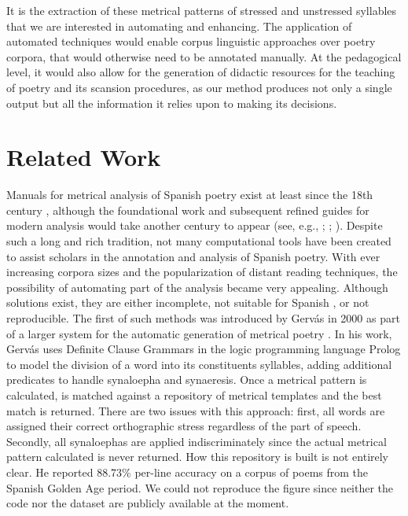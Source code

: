 \documentclass[a4paper,11pt,twocolumn,twoside]{article}
\begin{document}
It is the extraction of these metrical patterns of stressed and unstressed syllables that we are interested in automating and enhancing. The application of automated techniques would enable corpus linguistic approaches over poetry corpora, that would otherwise need to be annotated manually. At the pedagogical level, it would also allow for the generation of didactic resources for the teaching of poetry and its scansion procedures, as our method produces not only a single output but all the information it relies upon to making its decisions.

\section{Related Work}
Manuals for metrical analysis of Spanish poetry exist at least since the 18th century \cite{caparros1975contribucion}, although the foundational work and subsequent refined guides for modern analysis would take another century to appear (see, e.g., \cite{bello1859principios}; \cite{navarro1991metrica}; \cite{caparros1993metrica}). Despite such a long and rich tradition, not many computational tools have been created to assist scholars in the annotation and analysis of Spanish poetry. With ever increasing corpora sizes and the popularization of distant reading techniques, the possibility of automating part of the analysis became very appealing. Although solutions exist, they are either incomplete, not suitable for Spanish \cite{hartman2005scandroid,agirrezabal2016zeuscansion}, or not reproducible. The first of such methods was introduced by Gervás in 2000 as part of a larger system for the automatic generation of metrical poetry \cite{gervas2000logic}. In his work, Gervás uses Definite Clause Grammars in the logic programming language Prolog to model the division of a word into its constituents syllables, adding additional predicates to handle synaloepha and synaeresis. Once a metrical pattern is calculated, is matched against a repository of metrical templates and the best match is returned. There are two issues with this approach: first, all words are assigned their correct orthographic stress regardless of the part of speech. Secondly, all synaloephas are applied indiscriminately since the actual metrical pattern calculated is never returned. How this repository is built is not entirely clear. He reported 88.73\% per-line accuracy on a corpus of poems from the Spanish Golden Age period. We could not reproduce the figure since neither the code nor the dataset are publicly available at the moment.
\end{document}
